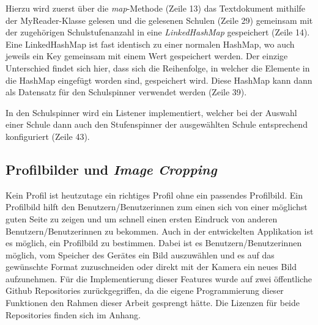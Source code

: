 \documentclass[../main.tex]{subfiles}
\begin{document}
	Hierzu wird zuerst über die \emph{map}-Methode (Zeile 13) das Textdokument mithilfe der MyReader-Klasse gelesen und die gelesenen Schulen (Zeile 29) gemeinsam mit der zugehörigen Schulstufenanzahl in eine \emph{LinkedHashMap} gespeichert (Zeile 14). Eine LinkedHashMap ist fast identisch zu einer normalen HashMap, wo auch jeweils ein Key gemeinsam mit einem Wert gespeichert werden. Der einzige Unterschied findet sich hier, dass sich die Reihenfolge, in welcher die Elemente in die HashMap eingefügt worden sind, gespeichert wird. Diese HashMap kann dann als Datensatz für den Schulspinner verwendet werden (Zeile 39).

	In den Schulspinner wird ein Listener implementiert, welcher bei der Auswahl einer Schule dann auch den Stufenspinner der ausgewählten Schule entsprechend konfiguriert (Zeile 43).

	\subsection{Profilbilder und \emph{Image Cropping}} \label{imageCropping}
	Kein Profil ist heutzutage ein richtiges Profil ohne ein passendes Profilbild. Ein Profilbild hilft den Benutzern/Benutzerinnen zum einen sich von einer möglichst guten Seite zu zeigen und um schnell einen ersten Eindruck von anderen Benutzern/Benutzerinnen zu bekommen. Auch in der entwickelten Applikation ist es möglich, ein Profilbild zu bestimmen. Dabei ist es Benutzern/Benutzerinnen möglich, vom Speicher des Gerätes ein Bild auszuwählen und es auf das gewünschte Format zuzuschneiden oder direkt mit der Kamera ein neues Bild aufzunehmen. Für die Implementierung dieser Features wurde auf zwei öffentliche Github Repositories zurückgegriffen, da die eigene Programmierung dieser Funktionen den Rahmen dieser Arbeit gesprengt hätte. Die Lizenzen für beide Repositories finden sich im Anhang.
	
\end{document}
